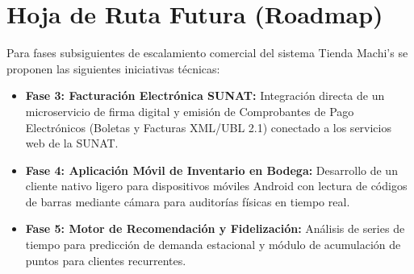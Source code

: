 \section{Hoja de Ruta Futura (Roadmap)}
Para fases subsiguientes de escalamiento comercial del sistema Tienda Machi's se proponen las siguientes iniciativas técnicas:
\begin{itemize}
    \item \textbf{Fase 3: Facturación Electrónica SUNAT:} Integración directa de un microservicio de firma digital y emisión de Comprobantes de Pago Electrónicos (Boletas y Facturas XML/UBL 2.1) conectado a los servicios web de la SUNAT.
    \item \textbf{Fase 4: Aplicación Móvil de Inventario en Bodega:} Desarrollo de un cliente nativo ligero para dispositivos móviles Android con lectura de códigos de barras mediante cámara para auditorías físicas en tiempo real.
    \item \textbf{Fase 5: Motor de Recomendación y Fidelización:} Análisis de series de tiempo para predicción de demanda estacional y módulo de acumulación de puntos para clientes recurrentes.
\end{itemize}
